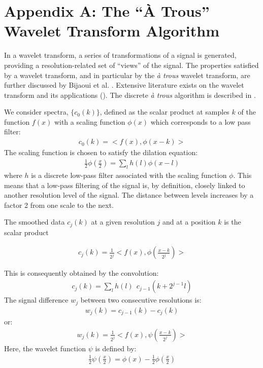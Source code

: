 \chapter*{Appendix A: The ``\`A Trous'' Wavelet Transform Algorithm}

In a wavelet transform, a series of transformations of a signal is 
generated, providing a resolution-related set of  ``views'' of the signal.  
The properties satisfied by a wavelet transform, and in particular by the
{\it \`a trous} wavelet transform, are further discussed by Bijaoui et al. \cite{starck:bij94_1}. 
Extensive literature exists on the wavelet transform
and its applications (\cite{wave:daube88,wave:chui92,wave:ruskai92,starck:book98}). 
The discrete {\it \`a trous} algorithm is described in \cite{wave:hol89,wave:shensa92}.

We consider spectra, 
$\{c_0(k)\}$, defined as  the scalar product at 
samples $k$ of the function $f(x)$ with a scaling function $\phi(x)$
which corresponds to a low pass filter:
\begin{eqnarray}
c_0(k) = < f(x), \phi(x-k)>
\end{eqnarray}
The scaling function is chosen to satisfy the dilation equation:
\begin{eqnarray}
\frac{1}{2}\phi(\frac{x}{2}) = \sum_l h(l)\phi(x-l)
\end{eqnarray}
where $h$ is a discrete low-pass filter associated with the scaling function
$\phi$.  This means that a low-pass filtering
of the signal is, by definition, closely linked to another resolution level
of the signal.  The distance between levels increases by a factor 2 from one
scale to the next.


The smoothed data $c_j(k)$ at a given resolution $j$ and at a position
$k$  is the scalar product 

\begin{eqnarray}
c_j(k)= \frac{1}{2^j}< f(x), \phi(\frac{x-k}{2^j})>
\end{eqnarray}

This is consequently obtained by the convolution:
\begin{eqnarray}
c_j(k) = \sum_l h(l) \ \ c_{j-1} (k+2^{j-1}l)
\end{eqnarray}
The signal difference $w_j$ between two consecutive resolutions is:
\begin{eqnarray}
w_j(k) = c_{j-1}(k) - c_j(k) 
\end{eqnarray}
or:
\begin{eqnarray}
w_j(k) = \frac{1}{2^j}< f(x), \psi(\frac{x-k}{2^j})>  
\label{wj}
\end{eqnarray}
Here, the wavelet function $\psi$ is defined by:
\begin{eqnarray}
\frac{1}{2}\psi(\frac{x}{2})  = \phi(x) - \frac{1}{2}\phi(\frac{x}{2})
\end{eqnarray}

